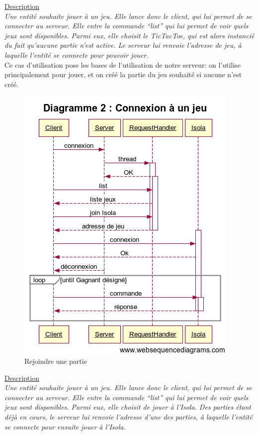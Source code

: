 \underline{Description}\\

\textit{Une entité souhaite jouer à un jeu. Elle lance donc le client, qui lui permet de se connecter 
au serveur. Elle entre la commande “list” qui lui permet de voir quels jeux sont disponibles. 
Parmi eux, elle choisit le TicTacToe, qui est alors instancié du fait qu'aucune partie n'est active. Le serveur lui renvoie l'adresse de jeu, à laquelle l'entité se connecte pour pouvoir jouer.}\\

\vspace{3em}
Ce cas d'utilisation pose les bases de l'utilisation de notre serveur: on l'utilise principalement pour jouer, et on créé la partie du jeu souhaité si aucune n'est créé.
\newpage


\begin{figure}[!ht]
	\center
	\includegraphics[scale=0.7]{images/sequence/diagramme_rejoindre.png}
	\caption{Rejoindre une partie}
\end{figure}

\underline{Description}\\

\textit{Une entité souhaite jouer à un jeu. Elle lance donc le client, qui lui permet de se connecter 
	au serveur. Elle entre la commande “list” qui lui permet de voir quels jeux sont disponibles. 
	Parmi eux, elle choisit de jouer à l'Isola. Des parties étant déjà en cours, le serveur lui renvoie l'adresse d'une des parties, à laquelle l'entité se connecte pour ensuite jouer à l'Isola.}\\

